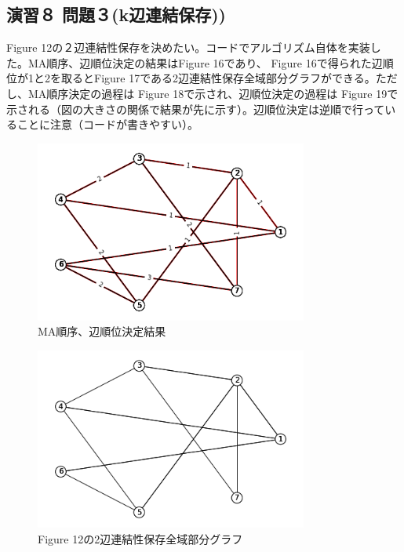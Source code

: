 \documentclass{report}
\begin{document}
\begin{CJK}{UTF8}{min}
    \section*{演習８ 問題３(k辺連結保存))}
    Figure 12の２辺連結性保存を決めたい。コードでアルゴリズム自体を実装した。MA順序、辺順位決定の結果はFigure 16であり、
    Figure 16で得られた辺順位が1と2を取るとFigure 17である2辺連結性保存全域部分グラフができる。ただし、MA順序決定の過程は
    Figure 18で示され、辺順位決定の過程は Figure 19で示される（図の大きさの関係で結果が先に示す）。辺順位決定は逆順で行っていることに注意（コードが書きやすい）。
    \begin{figure}[!h]
        \centerline{\includegraphics[width=0.8\textwidth]{data/ex-8-F-7.png}}
        \caption{MA順序、辺順位決定結果}
    \end{figure}

    \begin{figure}[!h]
        \centerline{\includegraphics[width=0.8\textwidth]{data/ex-8-2S.png}}
        \caption{Figure 12の2辺連結性保存全域部分グラフ}
    \end{figure}


\end{CJK}
\end{document}
